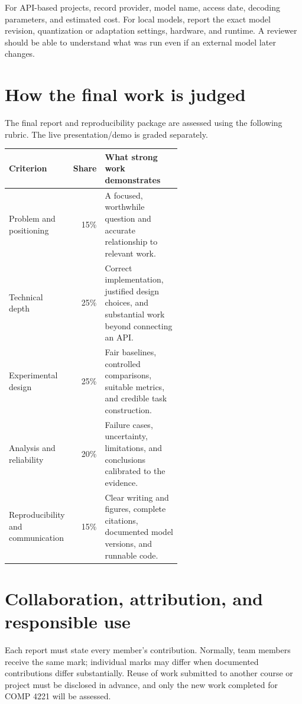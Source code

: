 \documentclass[11pt]{article}
\begin{document}
For API-based projects, record provider, model name, access date, decoding parameters, and estimated cost. For local models, report the exact model revision, quantization or adaptation settings, hardware, and runtime. A reviewer should be able to understand what was run even if an external model later changes.

\section{How the final work is judged}

The final report and reproducibility package are assessed using the following rubric. The live presentation/demo is graded separately.

\begin{center}
\begin{tabularx}{\linewidth}{@{}Xrp{0.58\linewidth}@{}}
\toprule
\textbf{Criterion} & \textbf{Share} & \textbf{What strong work demonstrates}\\
\midrule
Problem and positioning & 15\% & A focused, worthwhile question and accurate relationship to relevant work.\\
Technical depth & 25\% & Correct implementation, justified design choices, and substantial work beyond connecting an API.\\
Experimental design & 25\% & Fair baselines, controlled comparisons, suitable metrics, and credible task construction.\\
Analysis and reliability & 20\% & Failure cases, uncertainty, limitations, and conclusions calibrated to the evidence.\\
Reproducibility and communication & 15\% & Clear writing and figures, complete citations, documented model versions, and runnable code.\\
\bottomrule
\end{tabularx}
\end{center}

\section{Collaboration, attribution, and responsible use}

Each report must state every member's contribution. Normally, team members receive the same mark; individual marks may differ when documented contributions differ substantially. Reuse of work submitted to another course or project must be disclosed in advance, and only the new work completed for COMP 4221 will be assessed.
\end{document}
